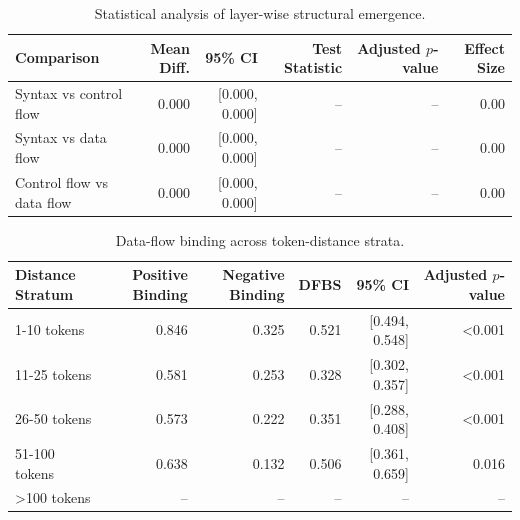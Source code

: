 \begin{table}[t]
\centering
\caption{Statistical analysis of layer-wise structural emergence.}
\label{tab:emerge}
\begin{tabular}{lrrrrr}
\toprule
Comparison & Mean Diff. & 95\% CI & Test Statistic & Adjusted $p$-value & Effect Size \\
\midrule
Syntax vs control flow & 0.000 & [0.000, 0.000] & -- & -- & 0.00 \\
Syntax vs data flow & 0.000 & [0.000, 0.000] & -- & -- & 0.00 \\
Control flow vs data flow & 0.000 & [0.000, 0.000] & -- & -- & 0.00 \\
\bottomrule
\end{tabular}
\end{table}

\begin{table}[t]
\centering
\caption{Data-flow binding across token-distance strata.}
\label{tab:strata}
\begin{tabular}{lrrrrr}
\toprule
Distance Stratum & Positive Binding & Negative Binding & DFBS & 95\% CI & Adjusted $p$-value \\
\midrule
1-10 tokens & 0.846 & 0.325 & 0.521 & [0.494, 0.548] & \textless{}0.001 \\
11-25 tokens & 0.581 & 0.253 & 0.328 & [0.302, 0.357] & \textless{}0.001 \\
26-50 tokens & 0.573 & 0.222 & 0.351 & [0.288, 0.408] & \textless{}0.001 \\
51-100 tokens & 0.638 & 0.132 & 0.506 & [0.361, 0.659] & 0.016 \\
\textgreater{}100 tokens & -- & -- & -- & -- & -- \\
\bottomrule
\end{tabular}
\end{table}
